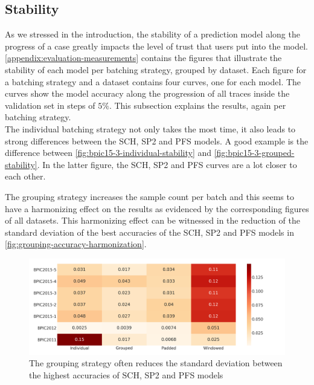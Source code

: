 \subsection*{Stability}
As we stressed in the introduction, the stability of a prediction model along the progress of a case greatly impacts the level of trust that users put into the model. \autoref{appendix:evaluation-measurements} contains the figures that illustrate the stability of each model per batching strategy, grouped by dataset. Each figure for a batching strategy and a dataset contains four curves, one for each model. The curves show the model accuracy along the progression of all traces inside the validation set in steps of $5\%$. This subsection explains the results, again per batching strategy.\\

The individual batching strategy not only takes the most time, it also leads to strong differences between the SCH, SP2 and PFS models. A good example is the difference between \autoref{fig:bpic15-3-individual-stability} and \autoref{fig:bpic15-3-grouped-stability}. In the latter figure, the SCH, SP2 and PFS curves are a lot closer to each other.

The grouping strategy increases the sample count per batch and this seems to have a harmonizing effect on the results as evidenced by the corresponding figures of all datasets. This harmonizing effect can be witnessed in the reduction of the standard deviation of the best accuracies of the SCH, SP2 and PFS models in \autoref{fig:grouping-accuracy-harmonization}.

\begin{figure}
    \centering
    \includegraphics[width=\textwidth]{gfx/grouping-accuracy-harmonization.png}
    \caption[Batching strategy harmonizes top accuracies]{The grouping strategy often reduces the standard deviation between the highest accuracies of SCH, SP2 and PFS models}
    \label{fig:grouping-accuracy-harmonization}
\end{figure}

